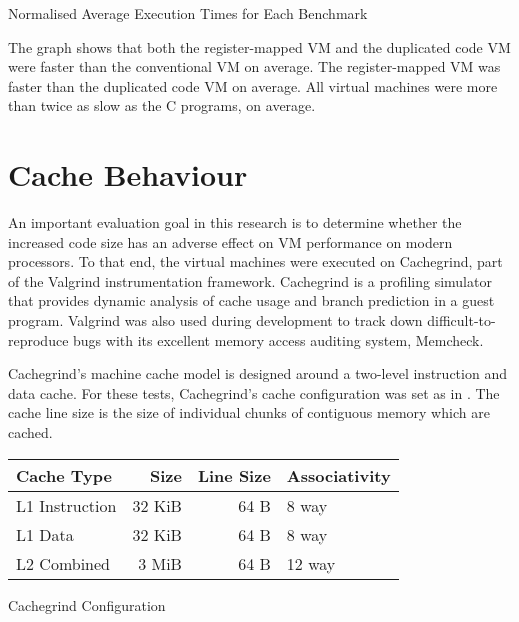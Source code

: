 		\begin{myfigure}
			\caption{Normalised Average Execution Times for Each Benchmark}
			\label{fig:normaltimes}
		\end{myfigure}
		
		The graph shows that both the register-mapped VM and the duplicated code VM were faster than the conventional VM on average. The register-mapped VM was faster than the duplicated code VM on average. All virtual machines were more than twice as slow as the C programs, on average.
	
	\section{Cache Behaviour}
		An important evaluation goal in this research is to determine whether the increased code size has an adverse effect on VM performance on modern processors. To that end, the virtual machines were executed on Cachegrind, part of the Valgrind instrumentation framework. Cachegrind is a profiling simulator that provides dynamic analysis of cache usage and branch prediction in a guest program. Valgrind was also used during development to track down difficult-to-reproduce bugs with its excellent memory access auditing system, Memcheck.
		
		Cachegrind's machine cache model is designed around a two-level instruction and data cache. For these tests, Cachegrind's cache configuration was set as in . The cache line size is the size of individual chunks of contiguous memory which are cached.
		
		\begin{myfigure}
			\begin{tabular}{|l|r|r|l|}
				\hline
				Cache Type & Size & Line Size & Associativity \\
				\hline
				L1 Instruction & 32 KiB & 64 B & 8 way \\
				\hline
				L1 Data & 32 KiB & 64 B & 8 way \\
				\hline
				L2 Combined & 3 MiB & 64 B & 12 way \\
				\hline
			\end{tabular}
			\caption{Cachegrind Configuration}
			\label{fig:cacheconfig}
		\end{myfigure}
	
